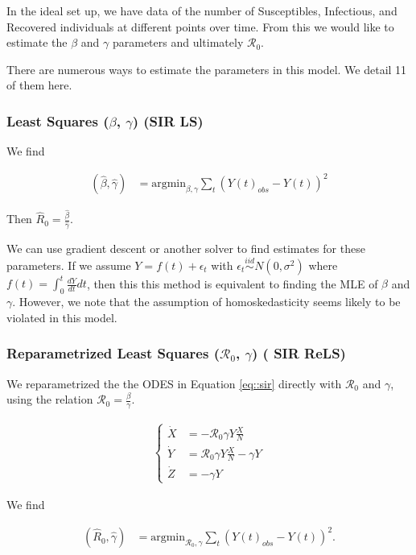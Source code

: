 \documentclass[12pt]{article}
\newcommand{\rr}{\ensuremath{\mathcal{R}_0}}
\begin{document}
In the ideal set up, we have data of the number of Susceptibles, Infectious, and Recovered individuals at different points over time.  From this we would like to estimate the $\beta$ and $\gamma$ parameters and ultimately $\rr$.

There are numerous ways to estimate the parameters in this model.  We detail 11 of them here.

\subsubsection{Least Squares ($\beta$, $\gamma$) (SIR LS)}\label{least-squares-beta-gamma}

We find

\begin{align*}
(\hat{\beta}, \hat{\gamma} )&=\text{argmin}_{\beta, \gamma} \sum_{t} (Y(t)_{obs} - Y(t))^2 
\end{align*}

Then \(\hat{R}_0= \frac{\hat{\beta}}{\hat{\gamma}}\).

We can use gradient descent or another solver to find estimates for these parameters.  If we assume $Y= f(t) + \epsilon_t$ with $\epsilon_t \overset{iid}{\sim} N(0, \sigma^2)$ where $f(t) = \int_0^t \frac{dY}{dt} dt$, then this this method is equivalent to finding the MLE of $\beta$ and $\gamma$.  However, we note that the assumption of homoskedasticity seems likely to be violated in this model.

\subsubsection{Reparametrized Least Squares ($\rr$, $\gamma$) ( SIR ReLS)}\label{reparametrized-least-squares-rux5f0-gamma}

We reparametrized the the ODES in Equation \eqref{eq::sir} directly with \(\rr\) and \(\gamma\), using the relation $\rr = \frac{\beta}{\gamma}$.

\begin{align*}
  \left \{
  \begin{array}{cl}
    \dot{X} &= - \rr \gamma Y \frac{X}{N}\\
    \dot{Y} &=  \rr \gamma Y \frac{X}{N}  - \gamma Y \\
    \dot{Z} &=  - \gamma Y 
  \end{array}
  \right .
  \end{align*}

We find

\begin{align*}
(\hat{R}_0, \hat{\gamma} )&=\text{argmin}_{\rr, \gamma} \sum_{t} (Y(t)_{obs} - Y(t))^2 .
\end{align*}
\end{document}
